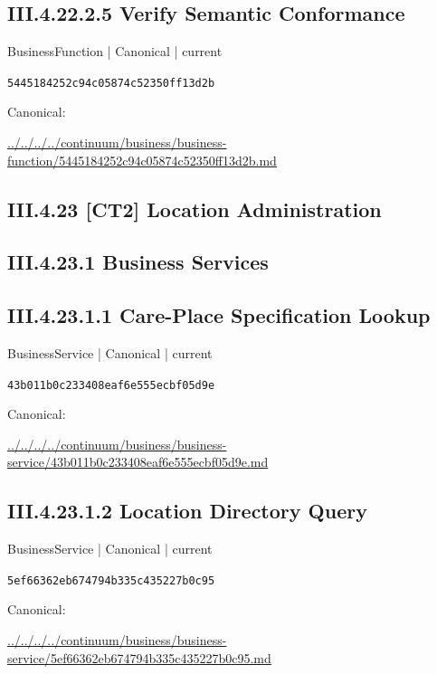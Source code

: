 \documentclass[10pt,a4paper]{article}
\begin{document}
\subsection*{III.4.22.2.5 Verify Semantic Conformance}
{\small BusinessFunction | Canonical | current}\par
\texttt{5445184252c94c05874c52350ff13d2b}\par
Canonical: \par
{\footnotesize\url{../../../../continuum/business/business-function/5445184252c94c05874c52350ff13d2b.md}}\par
\subsection*{III.4.23 [CT2] Location Administration}
\subsection*{III.4.23.1 Business Services}
\subsection*{III.4.23.1.1 Care-Place Specification Lookup}
{\small BusinessService | Canonical | current}\par
\texttt{43b011b0c233408eaf6e555ecbf05d9e}\par
Canonical: \par
{\footnotesize\url{../../../../continuum/business/business-service/43b011b0c233408eaf6e555ecbf05d9e.md}}\par
\subsection*{III.4.23.1.2 Location Directory Query}
{\small BusinessService | Canonical | current}\par
\texttt{5ef66362eb674794b335c435227b0c95}\par
Canonical: \par
{\footnotesize\url{../../../../continuum/business/business-service/5ef66362eb674794b335c435227b0c95.md}}\par
\end{document}
